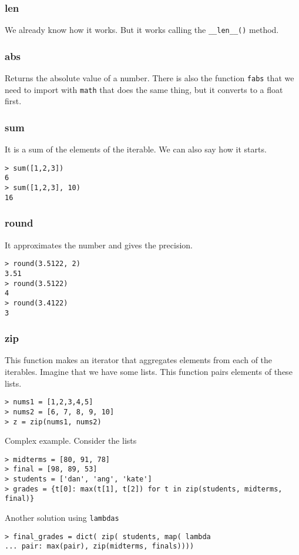\subsubsection{len} We already know how it works. But it works calling the \verb|__len__()| method. 

\subsubsection{abs} Returns the absolute value of a number. There is also the function \verb|fabs| that we need to import with \verb|math| that does the same thing, but it converts to a float first. 

\subsubsection{sum} It is a sum of the elements of the iterable. We can also say how it starts. 
\begin{verbatim}
> sum([1,2,3])
6 
> sum([1,2,3], 10)
16
\end{verbatim}

\subsubsection{round} It approximates the number and gives the precision. 
\begin{verbatim}
> round(3.5122, 2)
3.51
> round(3.5122)
4
> round(3.4122)
3
\end{verbatim}

\subsubsection{zip} This function makes an iterator that aggregates elements from each of the iterables. Imagine that we have some lists. This function pairs elements of these lists. 
\begin{verbatim}
> nums1 = [1,2,3,4,5]
> nums2 = [6, 7, 8, 9, 10]
> z = zip(nums1, nums2)
\end{verbatim}

Complex example. Consider the lists
\begin{verbatim}
> midterms = [80, 91, 78]
> final = [98, 89, 53]
> students = ['dan', 'ang', 'kate']
> grades = {t[0]: max(t[1], t[2]) for t in zip(students, midterms, final)}
\end{verbatim}

Another solution using \verb|lambdas|
\begin{verbatim}
> final_grades = dict( zip( students, map( lambda 
... pair: max(pair), zip(midterms, finals))))
\end{verbatim}

